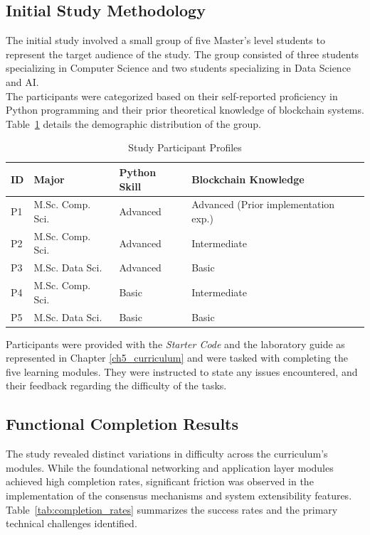 \subsection{Initial Study Methodology}
The initial study involved a small group of five Master's level students to represent the target audience of the study. The group consisted of three students specializing in Computer Science and two students specializing in Data Science and AI.\\The participants were categorized based on their self-reported proficiency in Python programming and their prior theoretical knowledge of blockchain systems. Table~\ref{tab:participant_profiles} details the demographic distribution of the group.

\begin{table}[H]
    \centering
    \begin{tabular}{|l|l|l|l|}
    \hline
    \textbf{ID} & \textbf{Major} & \textbf{Python Skill} & \textbf{Blockchain Knowledge} \\ \hline
    P1 & M.Sc. Comp. Sci. & Advanced & Advanced (Prior implementation exp.) \\ \hline
    P2 & M.Sc. Comp. Sci. & Advanced & Intermediate \\ \hline
    P3 & M.Sc. Data Sci. & Advanced & Basic \\ \hline
    P4 & M.Sc. Comp. Sci. & Basic & Intermediate \\ \hline
    P5 & M.Sc. Data Sci. & Basic & Basic \\ \hline
    \end{tabular}
    \caption{Study Participant Profiles}
    \label{tab:participant_profiles}
\end{table}
Participants were provided with the \textit{Starter Code} and the laboratory guide as represented in Chapter \ref{ch5_curriculum} and were tasked with completing the five learning modules. They were instructed to state any issues encountered, and their feedback regarding the difficulty of the tasks.

\subsection{Functional Completion Results}
The study revealed distinct variations in difficulty across the curriculum's modules. While the foundational networking and application layer modules achieved high completion rates, significant friction was observed in the implementation of the consensus mechanisms and system extensibility features. Table~\ref{tab:completion_rates} summarizes the success rates and the primary technical challenges identified.

